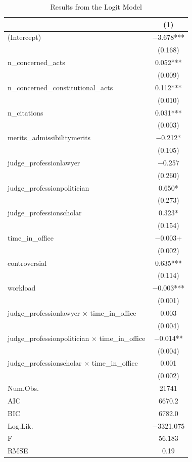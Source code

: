 \documentclass[
  11pt,
]{article}
\begin{document}
\begin{table}
\centering
\caption{\label{tab:unnamed-chunk-6}Results from the Logit Model}
\centering
\begin{tabular}[t]{lc}
\toprule
  & (1)\\
\midrule
(Intercept) & \num{-3.678}***\\
 & (\num{0.168})\\
n\_concerned\_acts & \num{0.052}***\\
 & (\num{0.009})\\
n\_concerned\_constitutional\_acts & \num{0.112}***\\
 & (\num{0.010})\\
n\_citations & \num{0.031}***\\
 & (\num{0.003})\\
merits\_admissibilitymerits & \num{-0.212}*\\
 & (\num{0.105})\\
judge\_professionlawyer & \num{-0.257}\\
 & (\num{0.260})\\
judge\_professionpolitician & \num{0.650}*\\
 & (\num{0.273})\\
judge\_professionscholar & \num{0.323}*\\
 & (\num{0.154})\\
time\_in\_office & \num{-0.003}+\\
 & \vphantom{1} (\num{0.002})\\
controversial & \num{0.635}***\\
 & (\num{0.114})\\
workload & \num{-0.003}***\\
 & (\num{0.001})\\
judge\_professionlawyer × time\_in\_office & \num{0.003}\\
 & \vphantom{1} (\num{0.004})\\
judge\_professionpolitician × time\_in\_office & \num{-0.014}**\\
 & (\num{0.004})\\
judge\_professionscholar × time\_in\_office & \num{0.001}\\
 & (\num{0.002})\\
\midrule
Num.Obs. & \num{21741}\\
AIC & \num{6670.2}\\
BIC & \num{6782.0}\\
Log.Lik. & \num{-3321.075}\\
F & \num{56.183}\\
RMSE & \num{0.19}\\
\bottomrule
\end{tabular}
\end{table}
\end{document}
